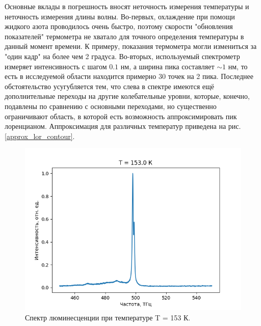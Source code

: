 Основные вклады в погрешность вносят неточность измерения температуры и неточность
измерения длины волны. Во-первых, охлаждение при помощи жидкого азота проводилось
очень быстро, поэтому скорости "обновления показателей" термометра не хватало
для точного определения температуры в данный момент времени. К примеру, показания
термометра могли измениться за "один кадр" на более чем 2 градуса. Во-вторых,
используемый спектрометр измеряет интенсивность с шагом $0.1 \text{ нм}$, а ширина
пика составляет $\sim 1 \text{ нм}$, то есть в исследуемой области находится примерно
30 точек на 2 пика. Последнее обстоятельство усугубляется тем, что слева в спектре 
имеются ещё дополнительные переходы на другие колебательные уровни, которые, конечно,
подавлены по сравнению с основными переходами, но существенно ограничивают область,
в которой есть возможность аппроксимировать пик лоренцианом. Аппроксимация для различных
температур приведена на рис. \ref{approx_lor_contour}. 

\begin{figure}[!h]
    \begin{center}
        \includegraphics[width=0.7 \linewidth]{spectre_general.png}
        \caption{Спектр люминесценции при температуре T = 153 К.}
        \label{spectre_general}
    \end{center}
\end{figure}



